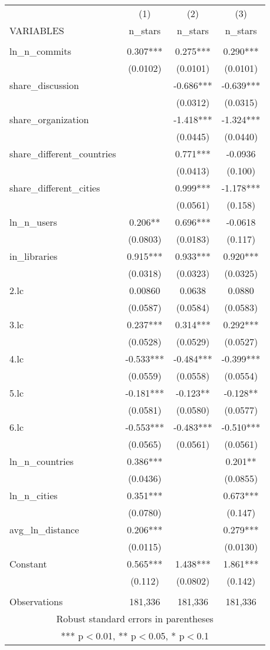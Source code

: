 \begin{tabular}{lccc} \hline
 & (1) & (2) & (3) \\
VARIABLES & n\_stars & n\_stars & n\_stars \\ \hline
 &  &  &  \\
ln\_n\_commits & 0.307*** & 0.275*** & 0.290*** \\
 & (0.0102) & (0.0101) & (0.0101) \\
share\_discussion &  & -0.686*** & -0.639*** \\
 &  & (0.0312) & (0.0315) \\
share\_organization &  & -1.418*** & -1.324*** \\
 &  & (0.0445) & (0.0440) \\
share\_different\_countries &  & 0.771*** & -0.0936 \\
 &  & (0.0413) & (0.100) \\
share\_different\_cities &  & 0.999*** & -1.178*** \\
 &  & (0.0561) & (0.158) \\
ln\_n\_users & 0.206** & 0.696*** & -0.0618 \\
 & (0.0803) & (0.0183) & (0.117) \\
in\_libraries & 0.915*** & 0.933*** & 0.920*** \\
 & (0.0318) & (0.0323) & (0.0325) \\
2.lc & 0.00860 & 0.0638 & 0.0880 \\
 & (0.0587) & (0.0584) & (0.0583) \\
3.lc & 0.237*** & 0.314*** & 0.292*** \\
 & (0.0528) & (0.0529) & (0.0527) \\
4.lc & -0.533*** & -0.484*** & -0.399*** \\
 & (0.0559) & (0.0558) & (0.0554) \\
5.lc & -0.181*** & -0.123** & -0.128** \\
 & (0.0581) & (0.0580) & (0.0577) \\
6.lc & -0.553*** & -0.483*** & -0.510*** \\
 & (0.0565) & (0.0561) & (0.0561) \\
ln\_n\_countries & 0.386*** &  & 0.201** \\
 & (0.0436) &  & (0.0855) \\
ln\_n\_cities & 0.351*** &  & 0.673*** \\
 & (0.0780) &  & (0.147) \\
avg\_ln\_distance & 0.206*** &  & 0.279*** \\
 & (0.0115) &  & (0.0130) \\
Constant & 0.565*** & 1.438*** & 1.861*** \\
 & (0.112) & (0.0802) & (0.142) \\
 &  &  &  \\
 Observations & 181,336 & 181,336 & 181,336 \\ \hline
\multicolumn{4}{c}{ Robust standard errors in parentheses} \\
\multicolumn{4}{c}{ *** p$<$0.01, ** p$<$0.05, * p$<$0.1} \\
\end{tabular}

